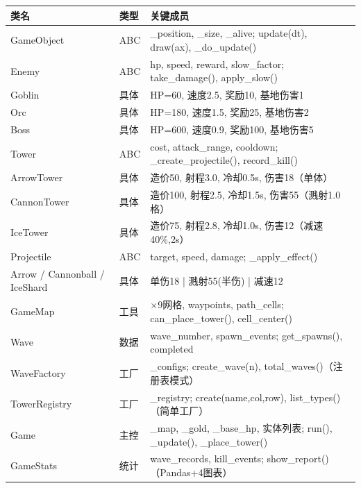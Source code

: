 \documentclass[9pt,a4paper]{ctexart}
\begin{document}
{\footnotesize\renewcommand{\arraystretch}{0.85}
\begin{tabular}{@{}>{\ttfamily}ll>{\raggedright\arraybackslash}p{5cm}@{}}
\toprule
\rmfamily\textbf{类名} & \textbf{类型} & \textbf{关键成员} \\
\midrule
GameObject & ABC & \_position, \_size, \_alive; \quad update(dt), draw(ax), \_do\_update() \\
\quad Enemy & ABC & hp, speed, reward, slow\_factor;  take\_damage(), apply\_slow() \\
\quad\quad Goblin  & 具体 & HP=60, 速度2.5, 奖励10, 基地伤害1 \\
\quad\quad Orc     & 具体 & HP=180, 速度1.5, 奖励25, 基地伤害2 \\
\quad\quad Boss    & 具体 & HP=600, 速度0.9, 奖励100, 基地伤害5 \\
\quad Tower & ABC & cost, attack\_range, cooldown;  \_create\_projectile(), record\_kill() \\
\quad\quad ArrowTower  & 具体 & 造价50, 射程3.0, 冷却0.5s, 伤害18（单体） \\
\quad\quad CannonTower & 具体 & 造价100, 射程2.5, 冷却1.5s, 伤害55（溅射1.0格） \\
\quad\quad IceTower    & 具体 & 造价75, 射程2.8, 冷却1.0s, 伤害12（减速40\%,2s） \\
\quad Projectile & ABC & target, speed, damage;  \_apply\_effect() \\
\quad\quad Arrow / Cannonball / IceShard & 具体 & 单伤18 | 溅射55(半伤) | 减速12 \\
\midrule
GameMap & 工具 & 15$\times$9网格, waypoints, path\_cells;  can\_place\_tower(), cell\_center() \\
Wave   & 数据 & wave\_number, spawn\_events;  get\_spawns(), completed \\
WaveFactory & 工厂 & \_configs;  create\_wave(n), total\_waves()（注册表模式） \\
TowerRegistry & 工厂 & \_registry;  create(name,col,row), list\_types()（简单工厂） \\
Game   & 主控 & \_map, \_gold, \_base\_hp, 实体列表;  run(), \_update(), \_place\_tower() \\
GameStats & 统计 & wave\_records, kill\_events;  show\_report()（Pandas+4图表） \\
\bottomrule
\end{tabular}
}
\end{document}
